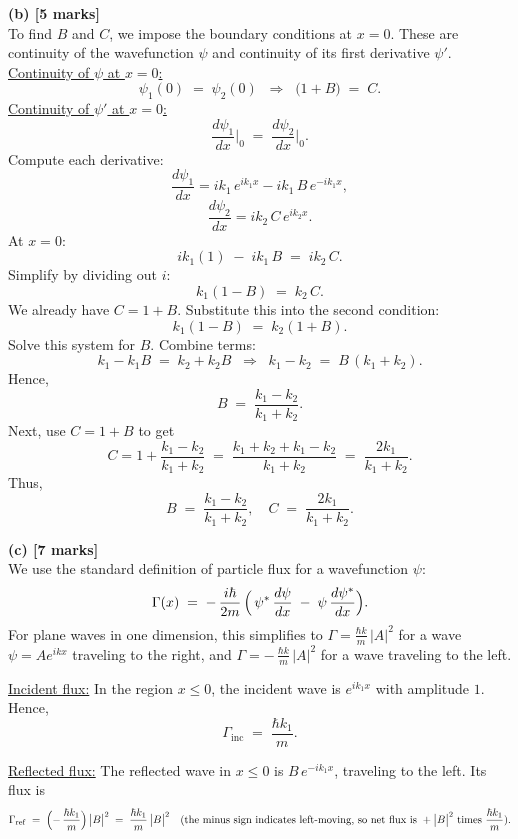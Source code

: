 \documentclass{article}
\begin{document}
\bigskip

\textbf{(b) [5 marks]}\\
To find \(B\) and \(C\), we impose the boundary conditions at \(x=0\). These are continuity of the wavefunction \(\psi\) and continuity of its first derivative \(\psi'\).\\[6pt]
\underline{Continuity of \(\psi\) at \(x=0\):}
\[
\psi_1(0) \;=\;\psi_2(0)
\;\;\Longrightarrow\;\;
\bigl(1 + B\bigr) \;=\;C.
\]
\underline{Continuity of \(\psi'\) at \(x=0\):}
\[
\frac{d\psi_1}{dx}\Big|_{0} \;=\;\frac{d\psi_2}{dx}\Big|_{0}.
\]
Compute each derivative:
\[
\frac{d\psi_1}{dx} = i k_1\, e^{ik_1 x} - i k_1\, B\, e^{-ik_1 x}, 
\]
\[
\frac{d\psi_2}{dx} = i k_2\, C\, e^{ik_2 x}.
\]
At \(x=0\):
\[
i k_1 (1) \;-\; i k_1\, B \;=\; i k_2 \, C.
\]
Simplify by dividing out \(i\):
\[
k_1(1 - B)\;=\; k_2\, C.
\]
We already have \( C = 1 + B \). Substitute this into the second condition:
\[
k_1 (1 - B) \;=\; k_2 (1 + B).
\]
Solve this system for \(B\). Combine terms:
\[
k_1 - k_1 B \;=\; k_2 + k_2 B
\;\;\Longrightarrow\;\;
k_1 - k_2 \;=\; B \,(k_1 + k_2).
\]
Hence,
\[
B \;=\;\frac{k_1 - k_2}{k_1 + k_2}.
\]
Next, use \(C = 1 + B\) to get
\[
C = 1 + \frac{k_1 - k_2}{k_1 + k_2}
\;=\;\frac{k_1 + k_2 + k_1 - k_2}{k_1 + k_2}
\;=\;\frac{2 k_1}{k_1 + k_2}.
\]
Thus,
\[
B \;=\;\frac{k_1 - k_2}{k_1 + k_2},
\quad
C \;=\;\frac{2k_1}{k_1 + k_2}.
\]

\bigskip

\textbf{(c) [7 marks]}\\
We use the standard definition of particle flux for a wavefunction \(\psi\):
\[
\Gamma(x) \;=\; -\,\frac{i\hbar}{2m}\,\Bigl(\,\psi^*\,\frac{d\psi}{dx} \;-\;\psi\,\frac{d\psi^*}{dx}\Bigr).
\]
For plane waves in one dimension, this simplifies to \(\Gamma = \frac{\hbar k}{m}\,|A|^2\) for a wave \(\psi = A e^{i k x}\) traveling to the right, and \(\Gamma = -\,\frac{\hbar k}{m}\,|A|^2\) for a wave traveling to the left.

\underline{Incident flux:} In the region \(x \le 0\), the incident wave is \(e^{i k_1 x}\) with amplitude \(1\). Hence,
\[
\Gamma_\mathrm{inc} \;=\;\frac{\hbar k_1}{m}.
\]

\underline{Reflected flux:} The reflected wave in \(x \le 0\) is \(B\,e^{-i k_1 x}\), traveling to the left. Its flux is
\[
\Gamma_\mathrm{ref} \;=\; \Bigl(-\,\frac{\hbar k_1}{m}\Bigr)\,\bigl|B\bigr|^2
\;=\;\frac{\hbar k_1}{m}\,\bigl|B\bigr|^2
\quad
(\text{the minus sign indicates left-moving, so net flux is } + \bigl|B\bigr|^2 \text{ times }\frac{\hbar k_1}{m}).
\]
\end{document}
